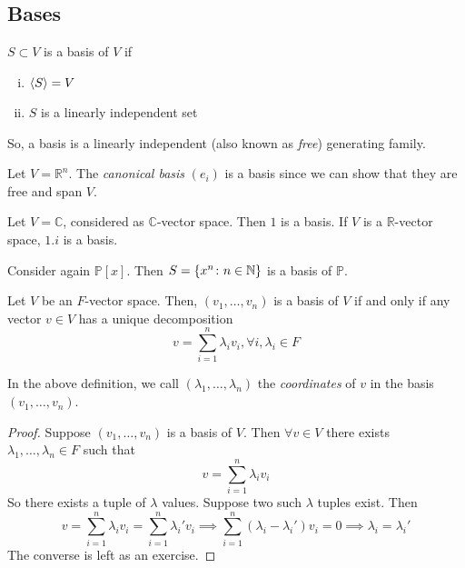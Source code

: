 \subsection{Bases}
\begin{definition}
    \( S \subset V \) is a basis of \( V \) if
    \begin{enumerate}[(i)]
        \item \( \langle{} S \rangle = V \)
        \item \( S \) is a linearly independent set
    \end{enumerate}
    So, a basis is a linearly independent (also known as \textit{free}) generating family.
\end{definition}
\begin{example}
    Let \( V = \mathbb R^n \).
    The \textit{canonical basis} \( (e_i) \) is a basis since we can show that they are free and span \( V \).
\end{example}
\begin{example}
    Let \( V = \mathbb C \), considered as \( \mathbb C \)-vector space.
    Then \( \qty{1} \) is a basis.
    If \( V \) is a \( \mathbb R \)-vector space, \( \qty{1,i} \) is a basis.
\end{example}
\begin{example}
    Consider again \( \mathbb P[x] \).
    Then \( S = \qty{x^n \colon n \in \mathbb N} \) is a basis of \( \mathbb P \).
\end{example}
\begin{lemma}
    Let \( V \) be an \( F \)-vector space.
    Then, \( (v_1, \dots, v_n) \) is a basis of \( V \) if and only if any vector \( v \in V \) has a unique decomposition
    \[ v = \sum_{i=1}^n \lambda_i v_i, \forall i, \lambda_i \in F \]
\end{lemma}
\begin{remark}
    In the above definition, we call \( (\lambda_1, \dots, \lambda_n) \) the \textit{coordinates} of \( v \) in the basis \( (v_1, \dots, v_n) \).
\end{remark}
\begin{proof}
    Suppose \( (v_1, \dots, v_n) \) is a basis of \( V \).
    Then \( \forall v \in V \) there exists \( \lambda_1, \dots, \lambda_n \in F \) such that
    \[ v = \sum_{i=1}^n \lambda_i v_i \]
    So there exists a tuple of \( \lambda \) values.
    Suppose two such \( \lambda \) tuples exist.
    Then
    \[ v = \sum_{i=1}^n \lambda_i v_i = \sum_{i=1}^n \lambda_i' v_i \implies \sum_{i=1}^n (\lambda_i - \lambda_i') v_i = 0 \implies \lambda_i = \lambda_i' \]
    The converse is left as an exercise.
\end{proof}
